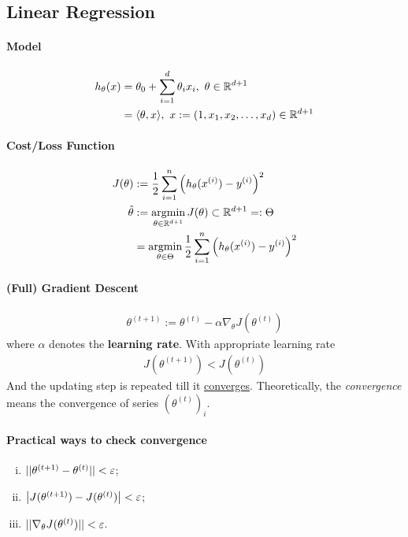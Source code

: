 \documentclass{report}
\begin{document}
        \subsection{Linear Regression}
        \paragraph{Model}
        \begin{align}
            h_\theta(x) &= \theta_0 + \sum_{i=1}^d \theta_i x_i,\ \theta \in \R^{d+1} \\
            &= \inner{\theta}{x},\ x := (1, x_1, x_2, \dots, x_d) \in \R^{d+1}
        \end{align}
        
        \paragraph{Cost/Loss Function}
        \begin{align}
            J(\theta) &:= \frac{1}{2} \sum_{i=1}^n \left(
                h_\theta(x^{(i)}) - y^{(i)}
            \right )^2 \\
            \hat{\theta} &:= \operatorname*{argmin}_{\theta \in \mathbb{R}^{d+1}} J(\theta) \subset \mathbb{R}^{d+1} =: \Theta\\
            &= \operatorname*{argmin}_{\theta \in \Theta} \frac{1}{2} \sum_{i=1}^n \left(h_\theta(x^{(i)}) - y^{(i)}\right)^2
        \end{align}
        
        \paragraph{(Full) Gradient Descent}
        \begin{align}
            \theta^{(t+1)} := \theta^{(t)} - \alpha \nabla_\theta J(\theta^{(t)})
        \end{align}
        where $\alpha$ denotes the \textbf{learning rate}. With appropriate learning rate
        \begin{align}
            J(\theta^{(t + 1)}) < J(\theta^{(t)})
        \end{align}
        And the updating step is repeated till it \ul{converges}. Theoretically, the \emph{convergence} means the convergence of series $(\theta^{(t)})_i$.\\
        \paragraph{Practical ways to check convergence}
        \begin{enumerate}[(i)]
            \item $\vert \vert {\theta^{(t+1)} - \theta^{(t)}} \vert \vert < \varepsilon$;
            \item $\big \vert {J(\theta^{(t+1)}) - J(\theta^{(t)})} \big \vert < \varepsilon$;
            \item $\vert \vert {\nabla_\theta J(\theta^{(t)})} \vert \vert < \varepsilon$.
        \end{enumerate}
        
\end{document}
